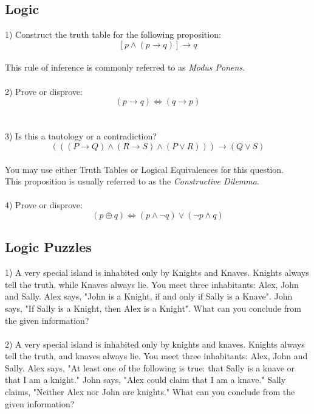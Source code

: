 \subsection{Logic}
1) Construct the truth table for the following proposition: \\
$$[p \wedge (p \rightarrow q)] \rightarrow q $$ \\
This rule of inference is commonly referred to as \emph{Modus Ponens}. \\ \\
2) Prove or disprove: \\
$$ (p \rightarrow q) \Leftrightarrow (q \rightarrow p)$$ \\ \\
3) Is this a tautology or a contradiction?
$$(( (P \rightarrow Q) \wedge (R \rightarrow S) \wedge (P \vee R))) \rightarrow
(Q \vee S) $$ \\
You may use either Truth Tables or Logical Equivalences for this question. \\
\indent This proposition is usually referred to as the \emph{Constructive
Dilemma}.\\ \\
4) Prove or disprove: \\
$$ (p \oplus q) \Leftrightarrow (p \wedge \neg q) \vee (\neg p \wedge q) $$

\subsection{Logic Puzzles}
1) A very special island is inhabited only by Knights and Knaves. Knights
always tell the truth, while Knaves always lie. You meet three inhabitants:
Alex, John and Sally. Alex says, "John is a Knight, if and only if Sally is a
Knave". John says, "If Sally is a Knight, then Alex is a Knight". What can you
conclude from the given information? \\ \\

2) A very special island is inhabited only by knights and knaves. Knights
always tell the truth, and knaves always lie. You meet three inhabitants: Alex,
John and Sally. Alex says, "At least one of the following is true: that Sally
is a knave or that I am a knight." John says, "Alex could claim that I am a
knave." Sally claims, "Neither Alex nor John are knights." What can you
conclude from the given information?
